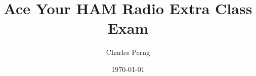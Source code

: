 \documentclass[12pt]{book}
\begin{document}
\title{Ace Your HAM Radio Extra Class Exam}
\author{Charles Perng}
\date{\today}
\maketitle

\frontmatter
\tableofcontents

\mainmatter

%

%
%
%





\end{document}
